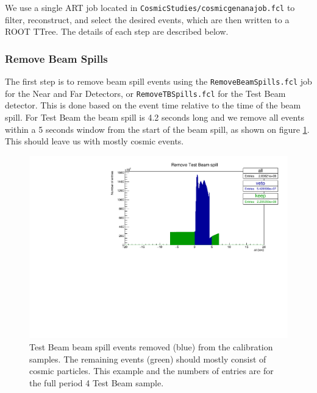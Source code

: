 \documentclass[12pt]{article}
\begin{document}
We use a single ART job located in \texttt{CosmicStudies/cosmicgenanajob.fcl} to filter, reconstruct, and select the desired events, which are then written to a ROOT TTree. The details of each step are described below.

\subsubsection{Remove Beam Spills}
The first step is to remove beam spill events using the \texttt{RemoveBeamSpills.fcl} job for the Near and Far Detectors, or \texttt{RemoveTBSpills.fcl} for the Test Beam detector. This is done based on the event time relative to the time of the beam spill. For Test Beam the beam spill is 4.2 seconds long and we remove all events within a 5 seconds window from the start of the beam spill, as shown on figure \ref{figRemoveTBSpills}. This should leave us with mostly cosmic events.

\begin{figure}[hbtp]
\centering
\includegraphics[width=\textwidth]{RemoveTBSpills.pdf}
\caption{Test Beam beam spill events removed (blue) from the calibration samples. The remaining events (green) should mostly consist of cosmic particles. This example and the numbers of entries are for the full period 4 Test Beam sample.}
\label{figRemoveTBSpills}
\end{figure}
\end{document}

